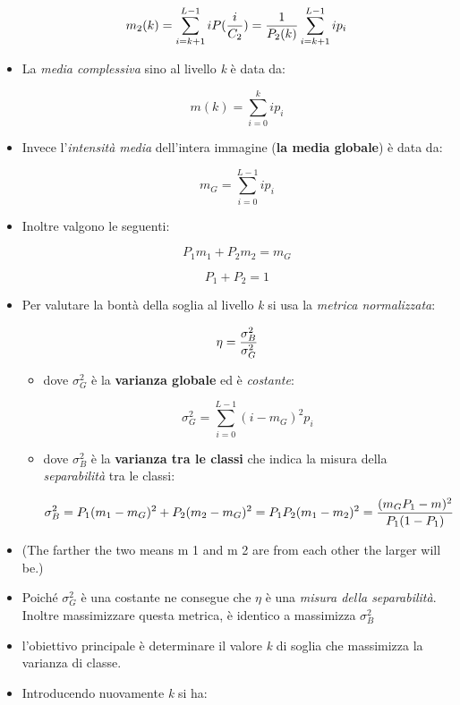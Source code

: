 \begin{itemize}
$$
m_2(k) = \sum_{i=k+1}^{L-1} i P({i \over C_2}) = {1 \over P_2(k)} \sum_{i=k+1}^{L-1} i p_i
$$


\item La \textit{media complessiva} sino al livello \textit{k} è data da:

$$
m(k) = \sum_{i=0}^{k} i p_i
$$

\item Invece l'\textit{intensità media} dell'intera immagine (\textbf{la media globale}) è data da:

$$
m_G = \sum_{i=0}^{L-1} i p_i
$$ 

\item Inoltre valgono le seguenti:

$$
P_1m_1 + P_2m_2 = m_G
$$

$$
P_1 + P_2 = 1
$$

\item Per valutare la bontà della soglia al livello \textit{k} si usa la \textit{metrica normalizzata}: 

$$
\eta = {\sigma_{B}^{2} \over \sigma_{G}^{2}}
$$

\begin{itemize}
\item dove $\sigma_{G}^{2}$ è la \textbf{varianza globale} ed è \textit{costante}:

$$
\sigma_{G}^{2} = \sum_{i=0}^{L-1} (i - m_G)^2 p_i
$$

\item dove $\sigma_{B}^{2}$ è la \textbf{varianza tra le classi} che indica la misura della \textit{separabilità} tra le classi:

$$
\sigma_{B}^{2} = P_1(m_1 - m_G)^2 + P_2(m_2 - m_G)^2 = P_1 P_2(m_1 - m_2)^2 = {(m_G P_1 - m)^2 \over P_1 (1 - P_1)}
$$
\end{itemize}

\item (The farther the two means m 1 and m 2 are from each other the larger will be.)

\item Poiché $\sigma_{G}^{2}$ è una costante ne consegue che $\eta$ è una \textit{misura della separabilità}. Inoltre massimizzare questa metrica, è identico a massimizza $\sigma_{B}^{2}$

\item l'obiettivo principale è determinare il valore \textit{k} di soglia che massimizza la varianza di classe.

\item Introducendo nuovamente \textit{k} si ha:


\end{itemize}
